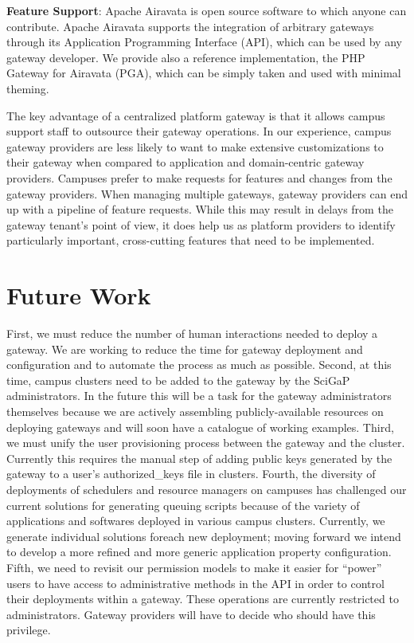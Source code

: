 \documentclass[sigconf]{acmart}
\begin{document}
\noindent\textbf{Feature Support}: Apache Airavata is open source software to which anyone can contribute. Apache Airavata supports the integration of arbitrary gateways through its Application Programming Interface (API), which can be used by any gateway developer. We provide also a reference implementation, the PHP Gateway for Airavata (PGA), which can be simply taken and used with minimal theming.

The key advantage of a centralized platform gateway is that it allows campus support staff to outsource their gateway operations. In our experience, campus gateway providers are less likely to want to make extensive customizations to their gateway when compared to application and domain-centric gateway providers. Campuses prefer to make requests for features and changes from the gateway providers.  When managing multiple gateways, gateway providers can end up with a pipeline of feature requests.  While this may result in delays from the gateway tenant's point of view, it does help us as platform providers to identify particularly important, cross-cutting features that need to be implemented.

\section{Future Work}
First, we must reduce the number of human interactions needed to deploy a gateway. We are working to reduce the time for gateway deployment and configuration and to automate the process as much as possible. Second, at this time, campus clusters need to be added to the gateway by the SciGaP administrators.  In the future this will be a task for the gateway administrators themselves because we are actively assembling publicly-available resources  on deploying gateways and will soon have a catalogue of  working examples.  Third, we must unify the user provisioning process between the gateway and the cluster.  Currently this requires the manual step of adding public keys generated by the gateway to a user's authorized\_keys file in clusters. Fourth, the diversity of deployments of schedulers and resource managers on campuses has challenged our current solutions for generating queuing scripts because of the variety of applications and softwares deployed in various campus clusters. Currently, we generate individual solutions foreach new deployment; moving forward we intend to develop a more refined and more generic application property configuration. Fifth, we need to revisit our permission models to make it easier for ``power'' users to have access to administrative methods in the API in order to control their deployments within a gateway. These operations are currently restricted to administrators. Gateway providers will have to decide who should have this privilege.
\end{document}
